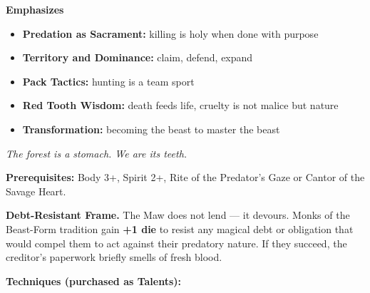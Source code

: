 \noindent\textbf{Emphasizes}
\begin{itemize}
  \item \textbf{Predation as Sacrament:} killing is holy when done with purpose
  \item \textbf{Territory and Dominance:} claim, defend, expand
  \item \textbf{Pack Tactics:} hunting is a team sport
  \item \textbf{Red Tooth Wisdom:} death feeds life, cruelty is not malice but nature
  \item \textbf{Transformation:} becoming the beast to master the beast
\end{itemize}

\begin{tcolorbox}[colback=black!5,colframe=brown!70!black,title=\textbf{Beast-Form (Savage Heart)},breakable]
  \emph{The forest is a stomach. We are its teeth.}

  \vspace{2mm}
  \noindent\textbf{Prerequisites:} Body 3+, Spirit 2+, Rite of the Predator's Gaze or Cantor of the Savage Heart.

  \vspace{2mm}
  \noindent\textbf{Debt-Resistant Frame.} The Maw does not lend --- it devours. Monks of the Beast-Form tradition gain \textbf{+1 die} to resist any magical debt or obligation that would compel them to act against their predatory nature. If they succeed, the creditor's paperwork briefly smells of fresh blood.

  \vspace{2mm}
  \noindent\textbf{Techniques (purchased as Talents):}


\end{tcolorbox}
